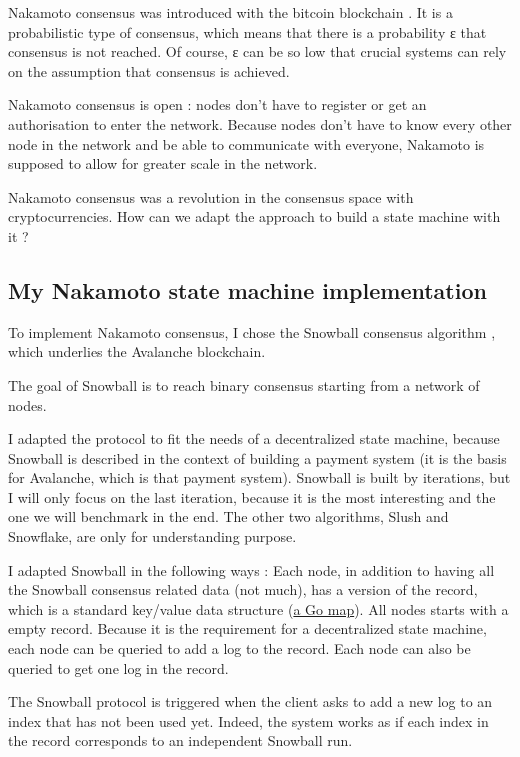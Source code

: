 \documentclass[11pt, twocolumn]{article}
\begin{document}
Nakamoto consensus was introduced with the bitcoin blockchain \cite{bitcoin}. It is a probabilistic type of consensus, which means that there is a probability ε that consensus is not reached.
Of course, ε can be so low that crucial systems can rely on the assumption that consensus is achieved.

Nakamoto consensus is open : nodes don't have to register or get an authorisation to enter the network.
Because nodes don't have to know every other node in the network and be able to communicate with everyone, Nakamoto is supposed to allow for greater scale in the network.

Nakamoto consensus was a revolution in the consensus space with cryptocurrencies. How can we adapt the approach to build a state machine with it ?

\subsection{My Nakamoto state machine implementation}

To implement Nakamoto consensus, I chose the Snowball consensus algorithm \cite{snowprotocol}, which underlies the Avalanche blockchain.

The goal of Snowball is to reach binary consensus starting from a network of nodes.

I adapted the protocol to fit the needs of a decentralized state machine, because Snowball is described in the context of building a payment system (it is the basis for Avalanche, which is that payment system).
Snowball is built by iterations, but I will only focus on the last iteration, because it is the most interesting and the one we will benchmark in the end.
The other two algorithms, Slush and Snowflake, are only for understanding purpose.

I adapted Snowball in the following ways : Each node, in addition to having all the Snowball consensus related data (not much), has a version of the record, which is a standard key/value data structure (\href{https://go.dev/blog/maps}{a Go map}). All nodes starts with a empty record.
Because it is the requirement for a decentralized state machine, each node can be queried to add a log to the record. Each node can also be queried to get one log in the record.

The Snowball protocol is triggered when the client asks to add a new log to an index that has not been used yet. Indeed, the system works as if each index in the record corresponds to an independent Snowball run.
\end{document}
